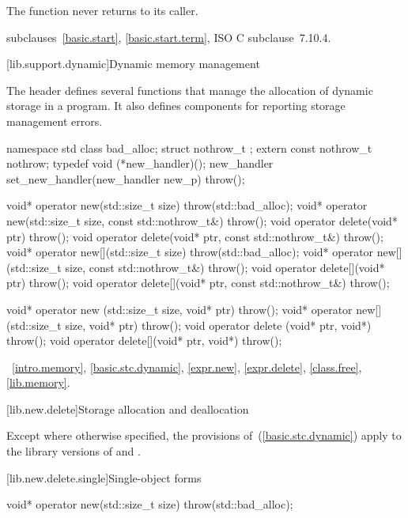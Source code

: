 \begin{itemdescr}
\end{itemdescr}

\pnum
The function  never returns to its caller.

\xref subclauses~\ref{basic.start}, \ref{basic.start.term},
ISO C subclause~7.10.4.

[lib.support.dynamic]{Dynamic memory management}

\pnum
The header
defines several
functions that manage the allocation of dynamic storage in a program.
It also defines components for reporting storage management errors.

%
%

\begin{codeblock}
namespace std {
  class bad_alloc;
  struct nothrow_t {};
  extern const nothrow_t nothrow;
  typedef void (*new_handler)();
  new_handler set_new_handler(new_handler new_p) throw();
}

  void* operator new(std::size_t size) throw(std::bad_alloc);
  void* operator new(std::size_t size, const std::nothrow_t&) throw();
  void  operator delete(void* ptr) throw();
  void  operator delete(void* ptr, const std::nothrow_t&) throw();
  void* operator new[](std::size_t size) throw(std::bad_alloc);
  void* operator new[](std::size_t size, const std::nothrow_t&) throw();
  void  operator delete[](void* ptr) throw();
  void  operator delete[](void* ptr, const std::nothrow_t&) throw();

  void* operator new  (std::size_t size, void* ptr) throw();
  void* operator new[](std::size_t size, void* ptr) throw();
  void  operator delete  (void* ptr, void*) throw();
  void  operator delete[](void* ptr, void*) throw();
\end{codeblock}

\xref~\ref{intro.memory}, \ref{basic.stc.dynamic},
\ref{expr.new}, \ref{expr.delete}, \ref{class.free},
\ref{lib.memory}.

[lib.new.delete]{Storage allocation and deallocation}

\pnum
Except where otherwise specified, the provisions of~(\ref{basic.stc.dynamic})
apply to the library versions of  and .

[lib.new.delete.single]{Single-object forms}

%
\begin{itemdecl}
void* operator new(std::size_t size) throw(std::bad_alloc);
\end{itemdecl}

